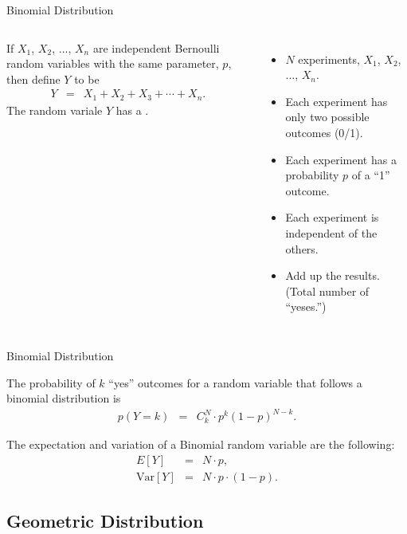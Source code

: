 \begin{frame}{Binomial Distribution}

  \begin{columns}
    \begin{definition}
      If $X_1$, $X_2$, $\ldots$, $X_n$ are independent Bernoulli
      random variables with the same parameter, $p$, then define $Y$
      to be 
      \begin{eqnarray*}
        Y & = & X_1 + X_2 + X_3 + \cdots + X_n.
      \end{eqnarray*}
      The random variale $Y$ has a .
    \end{definition}
    \begin{itemize}
    \item $N$ experiments, $X_1$, $X_2$, $\ldots$, $X_n$.
    \item Each experiment has only two possible outcomes (0/1).
    \item Each experiment has a probability $p$ of a ``1'' outcome.
    \item Each experiment is independent of the others.
    \item Add up the results. (Total number of ``yeses.'')
    \end{itemize}
  \end{columns}
\end{frame}


\begin{frame}{Binomial Distribution}

  \vfill
  
    The probability of $k$ ``yes'' outcomes for a random variable that
    follows a binomial distribution is
    \begin{eqnarray*}
      p(Y=k) & = & C^N_k \cdot p^k (1-p)^{N-k}.
    \end{eqnarray*}

    \vfill

    The expectation and variation of a Binomial random variable are
    the following:
    \begin{eqnarray*}
      E[Y] & = & N\cdot p, \\
      \mathrm{Var}[Y] & = & N \cdot p \cdot (1-p).
    \end{eqnarray*}

\end{frame}



\subsection{Geometric Distribution}

